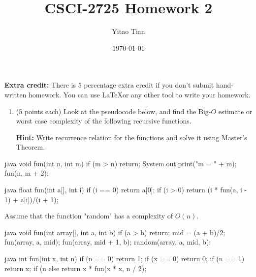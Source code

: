 \documentclass[12pt, a4paper]{article}
\title{CSCI-2725 Homework 2}
\author{Yitao Tian}
\date{\today}
\begin{document}
\maketitle

\textbf{Extra credit:} There is 5 percentage extra credit if you don't submit hand-written homework.
You can use \LaTeX or any other tool to write your homework.

\begin{enumerate}
  \item (5 points each) Look at the pseudocode below,
  and find the Big-$O$ estimate or worst case complexity of the following recursive functions.

  \textbf{Hint:} Write recurrence relation for the functions and solve it using Master's Theorem.
\end{enumerate}

\begin{MintedUnbreakableCodeBlock}{java}
      void fun(int n, int m) {
        if (m > n) return;
        System.out.print("m = " + m);
        fun(n, m + 2);
      }
\end{MintedUnbreakableCodeBlock}



\newpage



\begin{MintedUnbreakableCodeBlock}{java}
      float fun(int a[], int i) {
        if (i == 0) {
          return a[0];
        }
        if (i > 0) {
          return (i * fun(a, i - 1) + a[i])/(i + 1);
        }
      }
\end{MintedUnbreakableCodeBlock}



\newpage



Assume that the function "random" has a complexity of $O(n)$.
\begin{MintedUnbreakableCodeBlock}{java}
      void fun(int array[], int a, int b) {
        if (a > b) return;
        mid = (a + b)/2;
        fun(array, a, mid);
        fun(array, mid + 1, b);
        random(array, a, mid, b);
      }
\end{MintedUnbreakableCodeBlock}



\newpage



\begin{MintedUnbreakableCodeBlock}{java}
      int fun(int x, int n) {
        if (n == 0) return 1;
        if (x == 0) return 0;
        if (n == 1) return x;
        if (n %
        else return x * fun(x * x, n / 2);
      }
\end{MintedUnbreakableCodeBlock}
\end{document}
